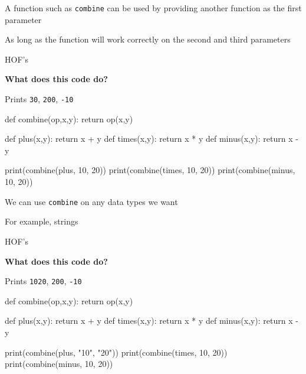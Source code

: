 \documentclass{beamer}
\begin{document}
\begin{slide}{
\item A function such as \texttt{combine} can be used by providing another function as the first parameter
\item As long as the function will work correctly on the second and third parameters
}\end{slide}

\begin{frame}[fragile]{HOF's}
\begin{codewithblock}{\item \textbf{What does this code do?} \pause \item Prints \texttt{30}, \texttt{200}, \texttt{-10}}
def combine(op,x,y):
  return op(x,y)

def plus(x,y): return x + y
def times(x,y): return x * y
def minus(x,y): return x - y
  
print(combine(plus, 10, 20))
print(combine(times, 10, 20))
print(combine(minus, 10, 20))
\end{codewithblock}
\end{frame}

\begin{slide}{
\item We can use \texttt{combine} on any data types we want
\item For example, strings
}\end{slide}

\begin{frame}[fragile]{HOF's}
\begin{codewithblock}{\item \textbf{What does this code do?} \pause \item Prints \texttt{1020}, \texttt{200}, \texttt{-10}}
def combine(op,x,y):
  return op(x,y)

def plus(x,y): return x + y
def times(x,y): return x * y
def minus(x,y): return x - y
  
print(combine(plus, "10", "20"))
print(combine(times, 10, 20))
print(combine(minus, 10, 20))
\end{codewithblock}
\end{frame}
\end{document}
